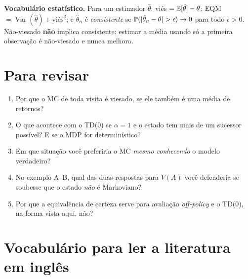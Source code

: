 \documentclass[11pt, a4paper]{article}
\begin{document}
\textbf{Vocabulário estatístico.} Para um estimador $\hat\theta$:
viés $=\mathbb{E}[\hat\theta]-\theta$; EQM $=\operatorname{Var}(\hat\theta)+\text{viés}^2$;
e $\hat\theta_n$ é \emph{consistente} se
$\mathbb{P}(\lvert\hat\theta_n-\theta\rvert>\epsilon)\to 0$ para todo $\epsilon>0$.
Não-viesado \textbf{não} implica consistente: estimar a média usando só a
primeira observação é não-viesado e nunca melhora.

\section{Para revisar}

\begin{enumerate}
  \item Por que o MC de toda visita é viesado, se ele também é uma média de
        retornos?
  \item O que acontece com o TD(0) se $\alpha=1$ e o estado tem mais de um
        sucessor possível? E se o MDP for determinístico?
  \item Em que situação você preferiria o MC \emph{mesmo conhecendo} o modelo
        verdadeiro?
  \item No exemplo A--B, qual das duas respostas para $V(A)$ você defenderia se
        soubesse que o estado \emph{não} é Markoviano?
  \item Por que a equivalência de certeza serve para avaliação \emph{off-policy}
        e o TD(0), na forma vista aqui, não?
\end{enumerate}

\vspace{0.3em}
\section{Vocabulário para ler a literatura em inglês}
\end{document}
